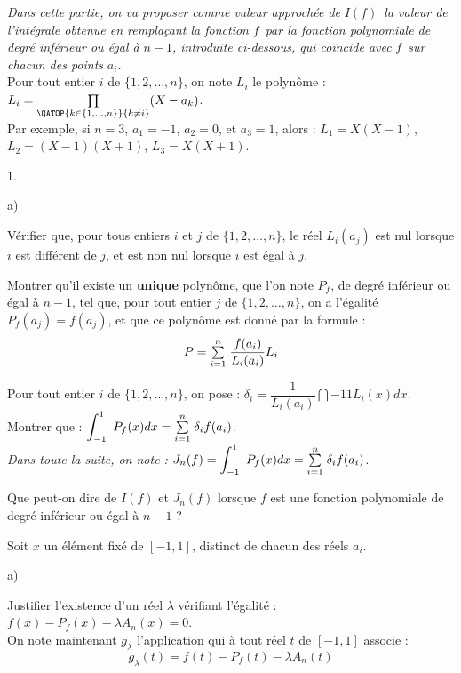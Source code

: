 \documentclass[11pt]{article}%
\begin{document}
\textit{Dans cette partie, on va proposer comme valeur approchée de
}$I(f)$\textit{\ la valeur de l'intégrale obtenue en remplaçant la
fonction }$f$\textit{\ par la fonction polynomiale de degré inférieur
ou égal à }$n-1$\textit{, introduite ci-dessous, qui coïncide avec
}$f$\textit{\ sur chacun
des points }$a_{i}$\textit{.}\\
Pour tout entier $i$ de $\{1,2,\dots,n\}$, on note $L_{i}$ le polynôme
: $L_{i} = \prod\limits_{\QATOP{k\in \{1,\dots,n\}}{k\not =
i}}(X-a_{k})$.\\
Par exemple, si $n = 3$, $a_{1} = -1$, $a_{2} = 0$, et $a_{3} = 1$,
alors : $L_{1} = X(X-1)$, $L_{2} = (X-1)(X + 1)$, $L_{3} = X(X + 1)$.

\begin{noliste}{1.}
 \setlength{\itemsep}{4mm}
\item 

\begin{noliste}{a)}
 \setlength{\itemsep}{2mm}
\item Vérifier que, pour tous entiers $i$ et $j$ de $\{1,2,\dots,n\}$,
le réel $L_{i}(a_{j})$ est nul lorsque $i$ est différent de $j$, et est
non nul
lorsque $i$ est égal à $j$.

\item Montrer qu'il existe un \textbf{unique} polynôme, que l'on note
$P_{f}$, de degré inférieur ou égal à $n-1$, tel que, pour tout entier
$j$ de $\{1,2,\dots,n\}$, on a l'égalité $P_{f}(a_{j}) = f(a_{j})$, et
que ce polynôme est donné par la formule : 
\[
P = {\textstyle\sum\limits_{i = 1}^{n}}\hspace{.1cm}\dfrac{f(a_{i})}{L_{i}(a_{i})}L_{i}
\]
\end{noliste}

\item Pour tout entier $i$ de $\{1,2,\dots,n\}$, on pose : $\delta_{i}
= \dfrac{1}{L_{i}(a_{i})}\dint{-1}{1}L_{i}(x)dx$.\\
Montrer que : $\displaystyle \int_{-1}^{1}\ P_{f}(x)dx = {\textstyle\sum\limits_{i = 1}^{n}}\hspace{.1cm}\delta
_{i}f(a_{i})$.\\
\textit{Dans toute la suite, on note :} $J_{n}(f) =
\displaystyle \int_{-1}^{1}\ P_{f}(x)dx = {\textstyle\sum\limits_{i = 1}^{n}}\hspace{.1cm}\delta_{i}f(a_{i})$.

\item Que peut-on dire de $I(f)$ et $J_{n}(f)$ lorsque $f$ est une
fonction
polynomiale de degré inférieur ou égal à $n-1$ ?

\item Soit $x$ un élément fixé de $[-1,1]$, distinct de chacun des
réels $a_{i}$.

\begin{noliste}{a)}
 \setlength{\itemsep}{2mm}
\item Justifier l'existence d'un réel $\lambda $ vérifiant l'égalité :
$f(x)-P_{f}(x)-\lambda A_{n}(x) = 0$.\\
On note maintenant $g_{\lambda }$ l'application qui à tout réel $t$ de
$[-1,1]$ associe : 
\[
g_{\lambda }(t) = f(t)-P_{f}(t)-\lambda A_{n}(t)
\]


\end{noliste}
\end{noliste}
\end{document}
